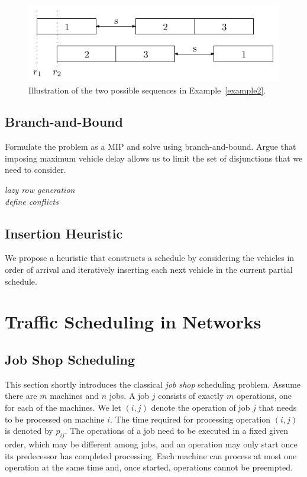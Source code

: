 \documentclass{article}
\theoremstyle{definition}
\begin{document}
\begin{figure}
  \centering
  \includegraphics{123.pdf}
  \caption{Illustration of the two possible sequences in Example~\ref{example2}.}
  \label{fig:example2}
\end{figure}



\subsection{Branch-and-Bound}

Formulate the problem as a MIP and solve using branch-and-bound. Argue that
imposing maximum vehicle delay allows us to limit the set of disjunctions that
we need to consider.

\vspace{0.5em}
\noindent
\textit{\color{blue}lazy row generation}\\
\textit{\color{blue}define conflicts}


\subsection{Insertion Heuristic}

We propose a heuristic that constructs a schedule by considering the vehicles in
order of arrival and iteratively inserting each next vehicle in the current
partial schedule.


\section{Traffic Scheduling in Networks}

\subsection{Job Shop Scheduling}

This section shortly introduces the classical \textit{job shop} scheduling
problem. Assume there are $m$ machines and $n$ jobs. A job $j$ consists of
exactly $m$ operations, one for each of the machines. We let $(i,j)$ denote the
operation of job $j$ that needs to be processed on machine $i$. The time
required for processing operation $(i,j)$ is denoted by $p_{ij}$. The operations
of a job need to be executed in a fixed given order, which may be different
among jobs, and an operation may only start once its predecessor has completed
processing. Each machine can process at most one operation at the same time and,
once started, operations cannot be preempted.
\end{document}
